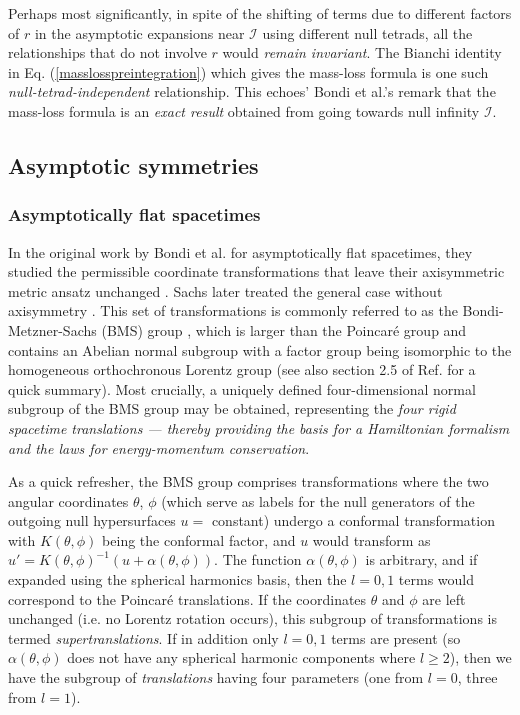 \documentclass[aps,pre,preprint,superscriptaddress,showpacs,showkeys]{revtex4-1}
\begin{document}
Perhaps most significantly, in spite of the shifting of terms due to different factors of $r$ in the asymptotic expansions near $\mathcal{I}$ using different null tetrads, all the relationships that do not involve $r$ would \emph{remain invariant}. The Bianchi identity in Eq. (\ref{masslosspreintegration}) which gives the mass-loss formula is one such \emph{null-tetrad-independent} relationship. This echoes' Bondi et al.'s \cite{Bondi62} remark that the mass-loss formula is an \emph{exact result} obtained from going towards null infinity $\mathcal{I}$.

\subsection{Asymptotic symmetries}\label{Section4B}

\subsubsection{Asymptotically flat spacetimes}\label{Section4B1}

In the original work by Bondi et al. for asymptotically flat spacetimes, they studied the permissible coordinate transformations that leave their axisymmetric metric ansatz unchanged \cite{Bondi62}. Sachs later treated the general case without axisymmetry \cite{Sachs62}. This set of transformations is commonly referred to as the Bondi-Metzner-Sachs (BMS) group \cite{Pen63}, which is larger than the Poincar\'{e} group and contains an Abelian normal subgroup with a factor group being isomorphic to the homogeneous orthochronous Lorentz group \cite{Sachsss,newpen65} (see also section 2.5 of Ref. \cite{ANK} for a quick summary). Most crucially, a uniquely defined four-dimensional normal subgroup of the BMS group may be obtained, representing the \emph{four rigid spacetime translations --- thereby providing the basis for a Hamiltonian formalism and the laws for energy-momentum conservation}.

As a quick refresher, the BMS group comprises transformations where the two angular coordinates $\theta$, $\phi$ (which serve as labels for the null generators of the outgoing null hypersurfaces $u=$ constant) undergo a conformal transformation with $K(\theta,\phi)$ being the conformal factor, and $u$ would transform as $u'=K(\theta,\phi)^{-1}(u+\alpha(\theta,\phi))$. The function $\alpha(\theta,\phi)$ is arbitrary, and if expanded using the spherical harmonics basis, then the $l=0,1$ terms would correspond to the Poincar\'{e} translations. If the coordinates $\theta$ and $\phi$ are left unchanged (i.e. no Lorentz rotation occurs), this subgroup of transformations is termed \emph{supertranslations}. If in addition only $l=0,1$ terms are present (so $\alpha(\theta,\phi)$ does not have any spherical harmonic components where $l\geq2$), then we have the subgroup of \emph{translations} having four parameters (one from $l=0$, three from $l=1$). 
\end{document}
